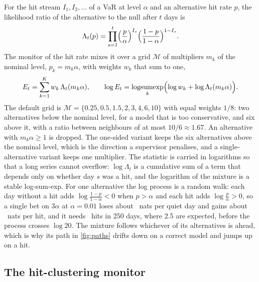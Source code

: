 For the hit stream $I_1,I_2,\dots$ of a VaR at level $\alpha$ and an alternative hit rate $p$, the likelihood ratio of the alternative to the null after $t$ days is
\begin{equation}
\Lambda_t(p)=\prod_{s=1}^{t}\Bigl(\frac{p}{\alpha}\Bigr)^{I_s}\Bigl(\frac{1-p}{1-\alpha}\Bigr)^{1-I_s}.
\label{eq:lr}
\end{equation}
The monitor of the hit rate mixes it over a grid $\mathcal M$ of multipliers $m_k$ of the nominal level, $p_k=m_k\alpha$, with weights $w_k$ that sum to one,
\begin{equation}
E_t=\sum_{k=1}^{K}w_k\,\Lambda_t(m_k\alpha),\qquad \log E_t=\operatorname*{logsumexp}_{k}\Bigl(\log w_k+\log\Lambda_t(m_k\alpha)\Bigr).
\label{eq:mixture}
\end{equation}
The default grid is $\mathcal M=\{0.25,0.5,1.5,2,3,4,6,10\}$ with equal weights $1/8$: two alternatives below the nominal level, for a model that is too conservative, and six above it, with a ratio between neighbours of at most $10/6\approx1.67$. An alternative with $m_k\alpha\ge1$ is dropped. The one-sided variant keeps the six alternatives above the nominal level, which is the direction a supervisor penalises, and a
single-alternative variant keeps one multiplier. The statistic is carried in logarithms so that a long series cannot overflow: $\log\Lambda_t$ is a cumulative sum of a
term that depends only on whether day $s$ was a hit, and the logarithm of the mixture is a stable log-sum-exp. For one alternative the log process is a random walk: each day without a hit adds $\log\frac{1-p}{1-\alpha}<0$ when $p>\alpha$ and each hit adds $\log\frac p\alpha>0$, so a single bet on $3\alpha$
at $\alpha=0.01$ loses about \nSingleQuietCost\ nats per quiet day and gains about \nSingleHitGain\ nats per hit, and it needs \nSingleHitsNeeded\ hits in 250 days, where 2.5 are expected, before the process crosses $\log 20$. The mixture follows whichever of its alternatives is ahead, which is why its path in \cref{fig:paths} drifts down on a correct model and jumps up on a hit.

\subsection{The hit-clustering monitor}
\label{sec:method-cluster}

